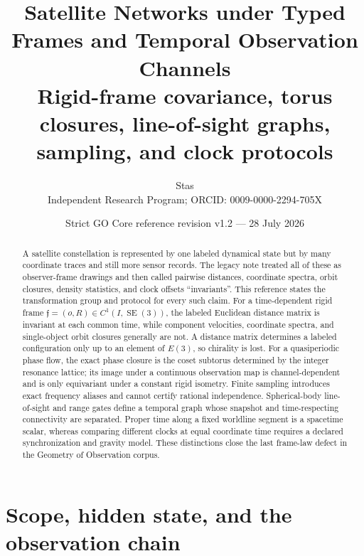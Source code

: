 \documentclass[11pt,a4paper]{article}
\title{\bfseries Satellite Networks under Typed Frames and Temporal Observation Channels\\
\large Rigid-frame covariance, torus closures, line-of-sight graphs, sampling, and clock protocols}
\author{Stas\\
\small Independent Research Program; ORCID: 0009-0000-2294-705X}
\date{Strict GO Core reference revision v1.2 --- 28 July 2026}
\theoremstyle{definition}
\theoremstyle{plain}
\theoremstyle{remark}
\newcommand{\SE}{\operatorname{SE}}
\begin{document}
\maketitle

\begin{center}
\end{center}

\begin{abstract}
A satellite constellation is represented by one labeled dynamical
state but by many coordinate traces and still more sensor records.
The legacy note treated all of these as observer-frame drawings and
then called pairwise distances, coordinate spectra, orbit closures,
density statistics, and clock offsets ``invariants''.  This reference
states the transformation group and protocol for every such claim.
For a time-dependent rigid frame
\(\mathfrak f=(o,R)\in C^1(I,\SE(3))\), the labeled Euclidean distance
matrix is invariant at each common time, while component velocities,
coordinate spectra, and single-object orbit closures generally are
not.  A distance matrix determines a labeled configuration only up to
an element of \(E(3)\), so chirality is lost.  For a quasiperiodic
phase flow, the exact phase closure is the coset subtorus determined
by the integer resonance lattice; its image under a continuous
observation map is channel-dependent and is only equivariant under a
constant rigid isometry.  Finite sampling introduces exact frequency
aliases and cannot certify rational independence.  Spherical-body
line-of-sight and range gates define a temporal graph whose snapshot
and time-respecting connectivity are separated.  Proper time along a
fixed worldline segment is a spacetime scalar, whereas comparing
different clocks at equal coordinate time requires a declared
synchronization and gravity model.  These distinctions close the
last frame-law defect in the Geometry of Observation corpus.
\end{abstract}

\tableofcontents

\section{Scope, hidden state, and the observation chain}
\end{document}
